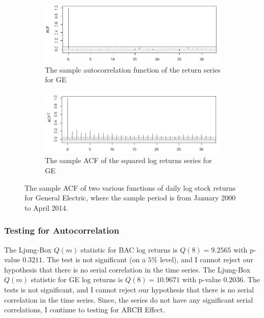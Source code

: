 \documentclass[a4paper,11pt,english]{article}
\begin{document}
			\begin{figure}[H]
				\centering
				\begin{subfigure}[b]{0.95\textwidth}
				\includegraphics[width=1\linewidth]{GEACF}
					\caption{The sample autocorrelation function of the return series for GE}
					\label{subfig:geacf1} 
				\end{subfigure}
				\begin{subfigure}[b]{0.95\textwidth}
					\includegraphics[width=1\linewidth]{GEACF2}
					\caption{The sample ACF of the squared log returns series for GE}
					\label{subfig:geacf2}
				\end{subfigure}
				\caption[numsol1]{The sample ACF of two various functions of daily log stock returns for General Electric, where the sample period is 
				from January 2000 to April 2014.}
				\end{figure}


			\subsubsection{Testing for Autocorrelation}
			
			The Ljung-Box $Q(m)$ statistic for BAC log returns is $Q(8) = 9.2565$ with p-value $0.3211$. The test is not significant (on a $5\%$ level), 
			and I cannot reject our hypothesis that there is no serial correlation in the time series. The Ljung-Box $Q(m)$ statistic for GE log returns 
			is $Q(8) = 10.9671$ with p-value $0.2036$. The tests is not significant, and I cannot reject our hypothesis that there is no serial 
			correlation in the time series. Since, the series do not have any significant serial correlations, I continue to testing for ARCH Effect.		
			
\end{document}
